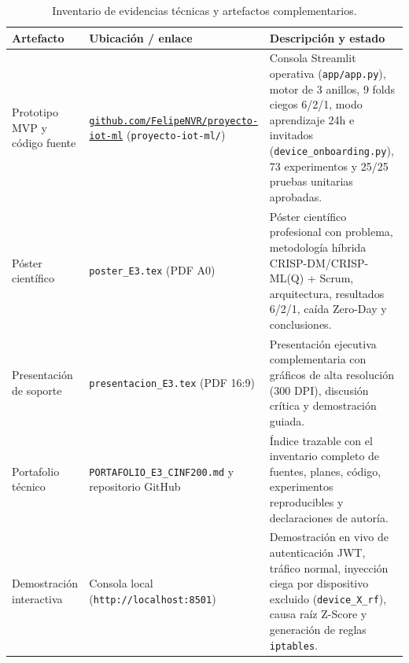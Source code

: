 \documentclass[11pt,a4paper]{article}
\begin{document}
\begin{table}[H]
\centering
\caption{Inventario de evidencias técnicas y artefactos complementarios.}
\label{tab:evidencias}
\footnotesize
\begin{tabularx}{\textwidth}{p{}p{}X}
\toprule
\textbf{Artefacto} & \textbf{Ubicación / enlace} & \textbf{Descripción y estado} \\
\midrule
Prototipo MVP y código fuente & \href{https://github.com/FelipeNVR/proyecto-iot-ml}{\texttt{github.com/FelipeNVR/\allowbreak proyecto-iot-ml}} (\texttt{proyecto-iot-ml/}) & Consola Streamlit operativa (\texttt{app/app.py}), motor de 3 anillos, 9 folds ciegos 6/2/1, modo aprendizaje 24h e invitados (\texttt{device\_onboarding.py}), 73 experimentos y 25/25 pruebas unitarias aprobadas. \\
Póster científico & \texttt{poster\_E3.tex} (PDF A0) & Póster científico profesional con problema, metodología híbrida CRISP-DM/CRISP-ML(Q) + Scrum, arquitectura, resultados 6/2/1, caída Zero-Day y conclusiones. \\
Presentación de soporte & \texttt{presentacion\_E3.tex} (PDF 16:9) & Presentación ejecutiva complementaria con gráficos de alta resolución (300 DPI), discusión crítica y demostración guiada. \\
Portafolio técnico & \texttt{PORTAFOLIO\_E3\_CINF200.md} y repositorio GitHub & Índice trazable con el inventario completo de fuentes, planes, código, experimentos reproducibles y declaraciones de autoría. \\
Demostración interactiva & Consola local (\texttt{http://localhost:8501}) & Demostración en vivo de autenticación JWT, tráfico normal, inyección ciega por dispositivo excluido (\texttt{device\_X\_rf}), causa raíz Z-Score y generación de reglas \texttt{iptables}. \\
\bottomrule
\end{tabularx}
\end{table}
\end{document}
